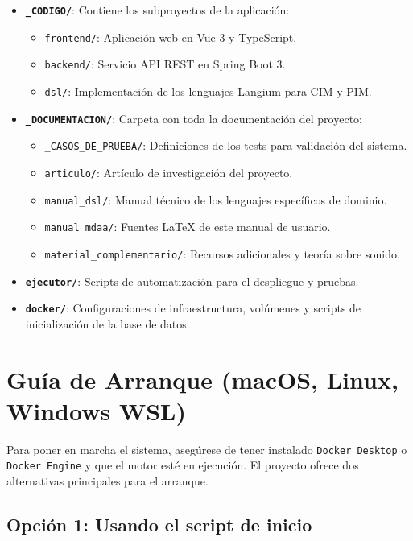 \begin{itemize}
    \item \textbf{\texttt{\_CODIGO/}}: Contiene los subproyectos de la aplicación:
    \begin{itemize}
        \item \texttt{frontend/}: Aplicación web en Vue 3 y TypeScript.
        \item \texttt{backend/}: Servicio API REST en Spring Boot 3.
        \item \texttt{dsl/}: Implementación de los lenguajes Langium para CIM y PIM.
    \end{itemize}
    \item \textbf{\texttt{\_DOCUMENTACION/}}: Carpeta con toda la documentación del proyecto:
    \begin{itemize}
        \item \texttt{\_CASOS\_DE\_PRUEBA/}: Definiciones de los tests para validación del sistema.
        \item \texttt{articulo/}: Artículo de investigación del proyecto.
        \item \texttt{manual\_dsl/}: Manual técnico de los lenguajes específicos de dominio.
        \item \texttt{manual\_mdaa/}: Fuentes LaTeX de este manual de usuario.
        \item \texttt{material\_complementario/}: Recursos adicionales y teoría sobre sonido.
    \end{itemize}
    \item \textbf{\texttt{ejecutor/}}: Scripts de automatización para el despliegue y pruebas.
    \item \textbf{\texttt{docker/}}: Configuraciones de infraestructura, volúmenes y scripts de inicialización de la base de datos.
\end{itemize}

\section{Guía de Arranque (macOS, Linux, Windows WSL)}

Para poner en marcha el sistema, asegúrese de tener instalado \texttt{Docker Desktop} o \texttt{Docker Engine} y que el motor esté en ejecución. El proyecto ofrece dos alternativas principales para el arranque.

\subsection{Opción 1: Usando el script de inicio}

